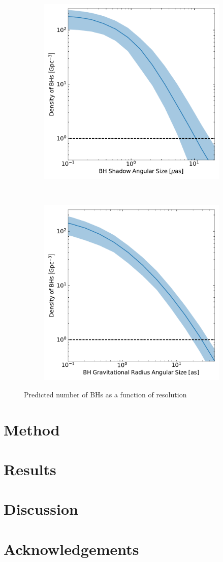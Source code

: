 \documentclass[RNAAS,twocolumn]{aastex63}
\begin{document}
\begin{figure}
    \centering
    \begin{subfigure}
        \centering
        \includegraphics[width=0.48\linewidth]{Figs/tot_shad.pdf}
    \end{subfigure}
    ~
    \begin{subfigure}
        \centering
        \includegraphics[width=0.48\linewidth]{Figs/tot_grav.pdf}
    \end{subfigure}
    \caption{Predicted number of BHs as a function of resolution \label{fig:Total_No.}}
\end{figure}


\section{Method}


\section{Results}




\section{Discussion}


\section*{Acknowledgements}




\end{document}
